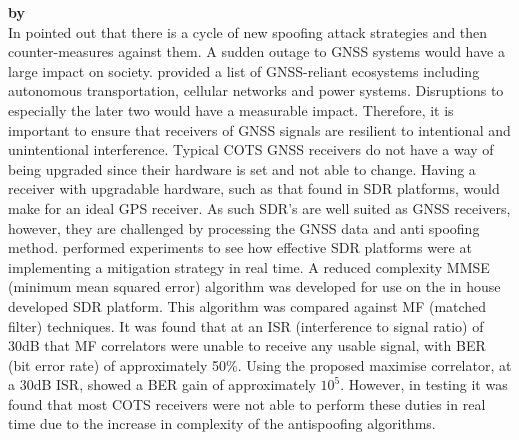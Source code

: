 \textbf{\emph{} by \citeauthor{RN18}} \\
In  \citeauthor{RN18} \cite{RN18} pointed out that there is a cycle of new spoofing attack strategies and then counter-measures
against them. A sudden outage to GNSS systems would have a large impact on society. \citeauthor{RN18} provided a list of GNSS-reliant ecosystems including
autonomous transportation, cellular networks and power systems. Disruptions to especially the later two would have a measurable impact. Therefore, it is
important to ensure that receivers of GNSS signals are resilient to intentional and unintentional interference.
Typical COTS GNSS receivers do not have a way of being upgraded since their hardware is set and not able to change. Having a receiver
with upgradable hardware, such as that found in SDR platforms, would make for an ideal GPS receiver. As such SDR's are well suited as GNSS receivers,
however, they are challenged by processing the GNSS data and anti spoofing method. \citeauthor{RN18} performed experiments to see how effective SDR 
platforms were at implementing a mitigation strategy in real time. A reduced complexity MMSE (minimum mean squared error) algorithm was developed for
use on the in house developed SDR platform. This algorithm was compared against MF (matched filter) techniques. It was found that at an ISR (interference to signal ratio)
of 30dB that MF correlators were unable to receive any usable signal, with BER (bit error rate) of approximately 50\%. Using the proposed maximise
correlator, at a 30dB ISR, showed a BER gain of approximately $10^5$. 
However, in testing it was found that most COTS receivers were not able to perform these duties in real time due to the increase in complexity of the antispoofing algorithms.

\medskip

